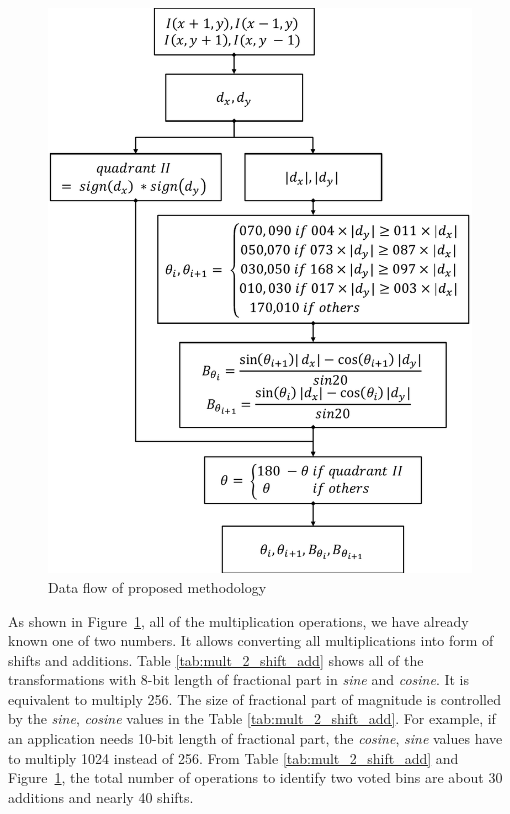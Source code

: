 \begin{figure}[h]
	\def\sscale{1.0\linewidth}
	\includegraphics[width=\sscale]{"imgs/dataflow"}
	\caption{Data flow of proposed methodology}
	\label{fig:dataflow}
\end{figure}

As shown in Figure~\ref{fig:dataflow}, all
of the multiplication operations, we have already known one of two numbers.
It allows converting all multiplications into form of shifts and additions.
Table \ref{tab:mult_2_shift_add} shows  all of the transformations
with 8-bit length of fractional part in \textit{sine} and \textit{cosine}.
It is equivalent to multiply 256.
The size of fractional part of magnitude is controlled by the \textit{sine}, \textit{cosine}
values in the Table \ref{tab:mult_2_shift_add}.
For example, if  an application needs 10-bit length of fractional part, the
\textit{cosine}, \textit{sine} values have to multiply 1024 instead of 256.
From Table \ref{tab:mult_2_shift_add} and 
Figure~\ref{fig:dataflow}, the total number of operations to identify two voted
bins are about 30 additions and nearly 40  shifts.

